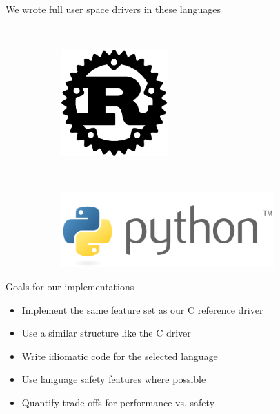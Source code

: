 \documentclass[NET,english,aspectratio=169,notitleframe]{tumbeamer}
\begin{document}
\begin{frame}{We wrote full user space drivers in these languages}
\begin{figure}
\begin{subfigure}[t]{0.2\columnwidth}
    \end{subfigure}
    ~ 
    \begin{subfigure}[t]{0.2\columnwidth}
        \centering
        \includegraphics[width=0.45\textwidth]{pics/rust}
    \end{subfigure}
    ~ 
    \begin{subfigure}[t]{0.3\columnwidth}
	\centering
        \includegraphics[width=0.9\textwidth]{pics/python}
    \end{subfigure}
\end{figure}
\end{frame}

\begin{frame}{Goals for our implementations}
\begin{itemize}
\item Implement the same feature set as our C reference driver
\item Use a similar structure like the C driver
\item Write idiomatic code for the selected language
\item Use language safety features where possible
\item Quantify trade-offs for performance vs. safety
\end{itemize}
\end{frame}
\end{document}

